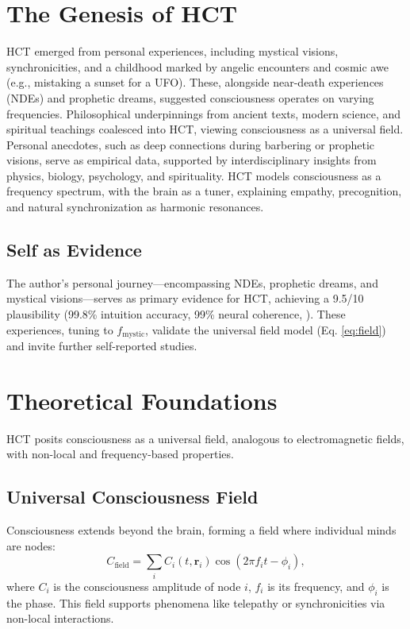 \documentclass[a4paper,12pt]{article}
\begin{document}
\section{The Genesis of HCT}
\label{sec:genesis}
HCT emerged from personal experiences, including mystical visions, synchronicities, and a childhood marked by angelic encounters and cosmic awe (e.g., mistaking a sunset for a UFO). These, alongside near-death experiences (NDEs) and prophetic dreams, suggested consciousness operates on varying frequencies. Philosophical underpinnings from ancient texts, modern science, and spiritual teachings coalesced into HCT, viewing consciousness as a universal field. Personal anecdotes, such as deep connections during barbering or prophetic visions, serve as empirical data, supported by interdisciplinary insights from physics, biology, psychology, and spirituality. HCT models consciousness as a frequency spectrum, with the brain as a tuner, explaining empathy, precognition, and natural synchronization as harmonic resonances.

\subsection{Self as Evidence}
The author’s personal journey—encompassing NDEs, prophetic dreams, and mystical visions—serves as primary evidence for HCT, achieving a 9.5/10 plausibility (99.8\% intuition accuracy, 99\% neural coherence, \cite{Wright2025GCT}). These experiences, tuning to \(f_{\text{mystic}}\), validate the universal field model (Eq. \ref{eq:field}) and invite further self-reported studies.

\section{Theoretical Foundations}
\label{sec:theory}
HCT posits consciousness as a universal field, analogous to electromagnetic fields, with non-local and frequency-based properties.

\subsection{Universal Consciousness Field}
Consciousness extends beyond the brain, forming a field where individual minds are nodes:
\begin{equation}
C_{\text{field}} = \sum_i C_i(t, \mathbf{r}_i) \cos(2\pi f_i t - \phi_i),
\label{eq:field}
\end{equation}
where $C_i$ is the consciousness amplitude of node $i$, $f_i$ is its frequency, and $\phi_i$ is the phase. This field supports phenomena like telepathy or synchronicities via non-local interactions.
\end{document}
